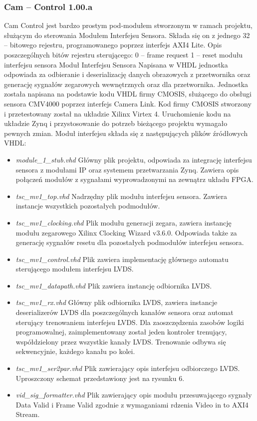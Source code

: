 \documentclass[a4paper,11pt,oneside]{book}  %
\begin{document}
\subsubsection{Cam – Control 1.00.a}
Cam Control jest bardzo prostym pod-modułem stworzonym w ramach projektu, służącym do sterowania Modułem Interfejsu Sensora. Składa się on z jednego 32 – bitowego rejestru, programowanego poprzez interfejs AXI4 Lite. Opis poszczególnych bitów rejestru sterującego: 0 – frame request 1 – reset modułu interfejsu sensora
Moduł Interfejsu Sensora Napisana w VHDL jednostka odpowiada za odbieranie i deserializację danych obrazowych z przetwornika oraz generację sygnałów zegarowych wewnętrznych oraz dla przetwornika. Jednostka została napisana na podstawie kodu VHDL firmy CMOSIS, służącego do obsługi sensora CMV4000 poprzez interfejs Camera Link. Kod firmy CMOSIS stworzony i przetestowany został na układzie Xilinx Virtex 4. Uruchomienie kodu na układzie Zynq i przystosowanie do potrzeb bieżącego projektu wymagało pewnych zmian.
Moduł interfejsu składa się z następujących plików źródłowych VHDL:
\begin{itemize}
\item  \textit{module\_1\_stub.vhd} Główny plik projektu, odpowiada za integrację interfejsu sensora z modułami IP oraz systemem przetwarzania Zynq. Zawiera opis połączeń modułów z sygnałami wyprowadzonymi na zewnątrz układu FPGA.

\item \textit{tsc\_mv1\_top.vhd} Nadrzędny plik modułu interfejsu sensora. Zawiera instancje wszystkich pozostałych podmodułów.

\item \textit{tsc\_mv1\_clocking.vhd} Plik modułu generacji zegara, zawiera instancję modułu zegarowego Xilinx Clocking Wizard v3.6.0. Odpowiada także za generację sygnałów resetu dla pozostałych podmodułów interfejsu sensora.

\item \textit{tsc\_mv1\_control.vhd} Plik zawiera implementację głównego automatu sterującego modułem interfejsu LVDS.

\item \textit{tsc\_mv1\_datapath.vhd} Plik zawiera instancję odbiornika LVDS.

\item \textit{tsc\_mv1\_rx.vhd} Główny plik odbiornika LVDS, zawiera instancje deserializerów LVDS dla poszczególnych kanałów sensora oraz automat sterujący trenowaniem interfejsu LVDS. Dla zaoszczędzenia zasobów logiki programowalnej, zaimplementowany został jeden kontroler trenujący, współdzielony przez wszystkie kanały LVDS. Trenowanie odbywa się sekwencyjnie, każdego kanału po kolei.

\item \textit{tsc\_mv1\_ser2par.vhd} Plik zawierający opis interfejsu odbiorczego LVDS. Uproszczony schemat przedstawiony jest na rysunku 6.

\item \textit{vid\_sig\_formatter.vhd} Plik zawierający opis modułu przesuwającego sygnały Data Valid i Frame Valid zgodnie z wymaganiami rdzenia Video in to AXI4 Stream.

\end{itemize}
\end{document}
